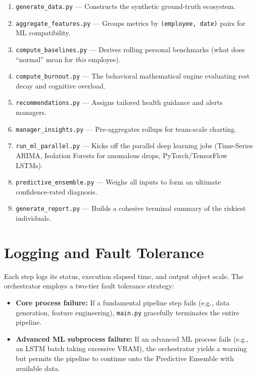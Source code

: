 \documentclass[12pt, a4paper, oneside]{report}
\begin{document}
\begin{enumerate}[label=\textbf{Step \arabic*.}]
    \item \texttt{generate\_data.py} --- Constructs the synthetic ground-truth ecosystem.
    \item \texttt{aggregate\_features.py} --- Groups metrics by \texttt{(employee, date)} pairs for ML compatibility.
    \item \texttt{compute\_baselines.py} --- Derives rolling personal benchmarks (what does ``normal'' mean for \emph{this} employee).
    \item \texttt{compute\_burnout.py} --- The behavioral mathematical engine evaluating rest decay and cognitive overload.
    \item \texttt{recommendations.py} --- Assigns tailored health guidance and alerts managers.
    \item \texttt{manager\_insights.py} --- Pre-aggregates rollups for team-scale charting.
    \item \texttt{run\_ml\_parallel.py} --- Kicks off the parallel deep learning jobs (Time-Series ARIMA, Isolation Forests for anomalous drops, PyTorch/TensorFlow LSTMs).
    \item \texttt{predictive\_ensemble.py} --- Weighs all inputs to form an ultimate confidence-rated diagnosis.
    \item \texttt{generate\_report.py} --- Builds a cohesive terminal summary of the riskiest individuals.
\end{enumerate}

\section{Logging and Fault Tolerance}
\label{sec:logging}

Each step logs its status, execution elapsed time, and output object scale. The orchestrator employs a two-tier fault tolerance strategy:

\begin{itemize}
    \item \textbf{Core process failure:} If a fundamental pipeline step fails (e.g., data generation, feature engineering), \texttt{main.py} gracefully terminates the entire pipeline.

    \item \textbf{Advanced ML subprocess failure:} If an advanced ML process fails (e.g., an LSTM batch taking excessive VRAM), the orchestrator yields a warning but permits the pipeline to continue onto the Predictive Ensemble with available data.
\end{itemize}
\end{document}
